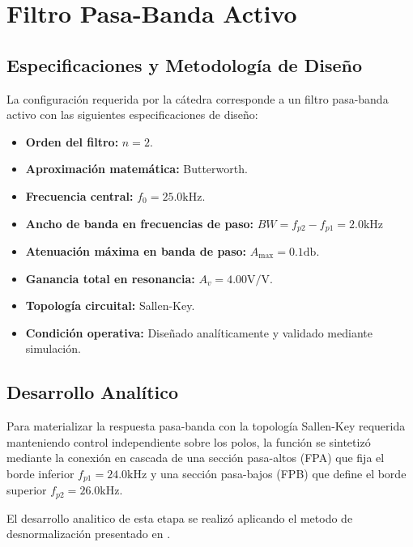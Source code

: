 \chapter{Filtro Pasa-Banda Activo}
\section{Especificaciones y Metodología de Diseño}

La configuración requerida por la cátedra corresponde a un filtro pasa-banda activo con las siguientes especificaciones
de diseño:
\begin{itemize}
    \item \textbf{Orden del filtro:} $n = 2$.
    \item \textbf{Aproximación matemática:} Butterworth.
    \item \textbf{Frecuencia central:} $f_0 = 25.0 \unit{\kilo\hertz}$.
    \item \textbf{Ancho de banda en frecuencias de paso:} $BW = f_{p2} - f_{p1} = 2.0 \unit{\kilo\hertz}$
    \item \textbf{Atenuación máxima en banda de paso:} $A_{\max} = 0.1 \unit{\decibel}$.
    \item \textbf{Ganancia total en resonancia:} $A_v = 4.00 \unit{\volt\per\volt}$.
    \item \textbf{Topología circuital:} Sallen-Key.
    \item \textbf{Condición operativa:} Diseñado analíticamente y validado mediante simulación.
\end{itemize}

\section{Desarrollo Analítico}
Para materializar la respuesta pasa-banda con la topología Sallen-Key requerida manteniendo control independiente
sobre los polos, la función se sintetizó mediante la conexión en cascada de una sección pasa-altos (FPA) que fija
el borde inferior $f_{p1} = 24.0 \unit{\kilo\hertz}$ y una sección pasa-bajos (FPB) que define el borde superior
$f_{p2} = 26.0 \unit{\kilo\hertz}$.

El desarrollo analitico de esta etapa se realizó aplicando el metodo de desnormalización presentado en \cite{pactitis2001}.

